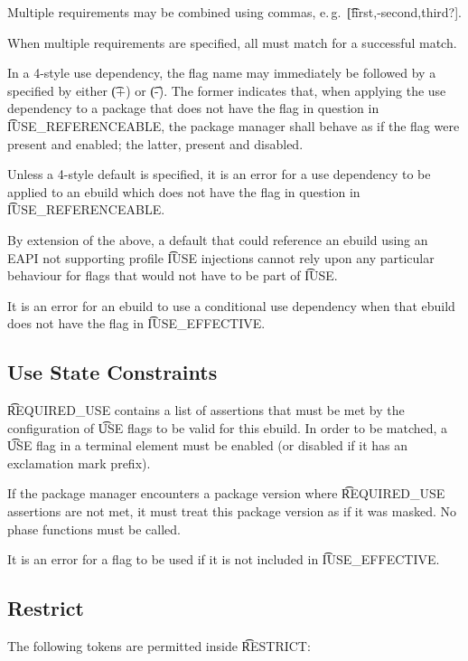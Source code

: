 Multiple requirements may be combined using commas, e.\,g.\ \t{[first,-second,third?]}.

When multiple requirements are specified, all must match for a successful match.

 In a 4-style use dependency, the flag name may immediately be
followed by a  specified by either \t{(+)} or \t{(-)}. The former indicates that, when
applying the use dependency to a package that does not have the flag in question in
\t{IUSE\_REFERENCEABLE}, the package manager shall behave as if the flag were present and enabled;
the latter, present and disabled.

Unless a 4-style default is specified, it is an error for a use dependency to be applied to an
ebuild which does not have the flag in question in \t{IUSE\_REFERENCEABLE}.

\note By extension of the above, a default that could reference an ebuild using an EAPI not
supporting profile \t{IUSE} injections cannot rely upon any particular behaviour for flags that
would not have to be part of \t{IUSE}.

It is an error for an ebuild to use a conditional use dependency when that ebuild does not have the
flag in \t{IUSE\_EFFECTIVE}.

\subsection{Use State Constraints}
\label{sec:required-use}
\t{REQUIRED\_USE} contains a list of assertions that must be met by the configuration of \t{USE}
flags to be valid for this ebuild. In order to be matched, a \t{USE} flag in a terminal element
must be enabled (or disabled if it has an exclamation mark prefix).

If the package manager encounters a package version where \t{REQUIRED\_USE} assertions are not met,
it must treat this package version as if it was masked. No phase functions must be called.

It is an error for a flag to be used if it is not included in \t{IUSE\_EFFECTIVE}.

\subsection{Restrict}
\label{sec:restrict}

The following tokens are permitted inside \t{RESTRICT}:

